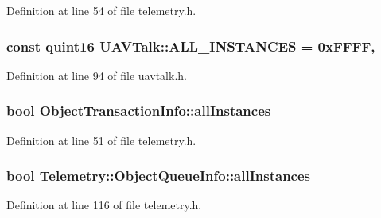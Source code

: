 Definition at line 54 of file telemetry.\-h.

\hypertarget{group___u_a_v_talk_plugin_ga71e922ea4fa7f9e0a9fe89ebdd2fe75c}{
\subsubsection[{A\-L\-L\-\_\-\-I\-N\-S\-T\-A\-N\-C\-E\-S}]{\setlength{\rightskip}{0pt plus 5cm}const quint16 U\-A\-V\-Talk\-::\-A\-L\-L\-\_\-\-I\-N\-S\-T\-A\-N\-C\-E\-S = 0x\-F\-F\-F\-F\hspace{0.3cm}{\ttfamily [static]}, {\ttfamily [protected]}}}\label{group___u_a_v_talk_plugin_ga71e922ea4fa7f9e0a9fe89ebdd2fe75c}


Definition at line 94 of file uavtalk.\-h.

\hypertarget{group___u_a_v_talk_plugin_gaf134962f4df09323cf89245e3bc32f6e}{
\subsubsection[{all\-Instances}]{\setlength{\rightskip}{0pt plus 5cm}bool Object\-Transaction\-Info\-::all\-Instances}}\label{group___u_a_v_talk_plugin_gaf134962f4df09323cf89245e3bc32f6e}


Definition at line 51 of file telemetry.\-h.

\hypertarget{group___u_a_v_talk_plugin_gaf8816b148dce6b50838c9e84272a1d04}{
\subsubsection[{all\-Instances}]{\setlength{\rightskip}{0pt plus 5cm}bool Telemetry\-::\-Object\-Queue\-Info\-::all\-Instances}}\label{group___u_a_v_talk_plugin_gaf8816b148dce6b50838c9e84272a1d04}


Definition at line 116 of file telemetry.\-h.

